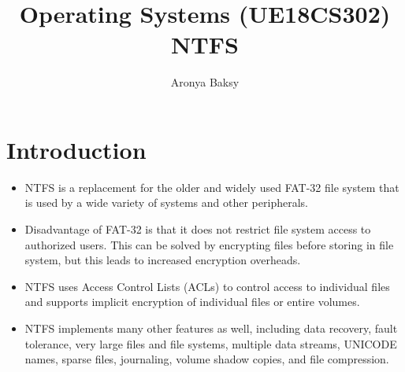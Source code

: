 \documentclass{article}
\title{Operating Systems (UE18CS302)\\
    \large NTFS}
\author{Aronya Baksy}
\theoremstyle{plain}
\theoremstyle{definition}
\begin{document}
    \maketitle
    
\section{Introduction}
\begin{itemize}
    \item NTFS is a replacement for the older and widely used FAT-32 file system that is used by a wide variety of systems and other peripherals. 
    
    \item Disadvantage of FAT-32 is that it does not restrict file system access to authorized users. This can be solved by encrypting files before storing in file system, but this leads to increased encryption overheads. 
    
    \item NTFS uses Access Control Lists (ACLs) to control access to individual files and supports
    implicit encryption of individual files or entire volumes.
    
    \item NTFS implements many other features as well, including data recovery, fault tolerance, very large files and file systems, multiple data streams, UNICODE names, sparse files, journaling, volume shadow copies, and file compression.
\end{itemize}
\end{document}
